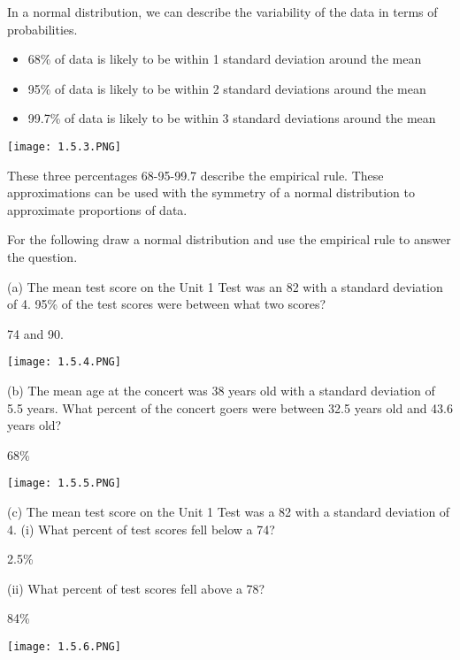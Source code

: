 \documentclass[../stats.tex]{subfiles}
\begin{document}
In a normal distribution, we can describe the variability of the data in terms of probabilities.
\begin{itemize}
    \item 68\% of data is likely to be within 1 standard deviation around the mean 
    \item 95\% of data is likely to be within 2 standard deviations around the mean 
    \item 99.7\% of data is likely to be within 3 standard deviations around the mean 
\end{itemize}
\begin{center}
    \texttt{[image: 1.5.3.PNG]}
\end{center}
These three percentages 68-95-99.7 describe the empirical rule. These approximations can be used with the symmetry of a normal distribution to approximate proportions of data.

\pagebreak
\begin{example}
    For the following draw a normal distribution and use the empirical rule to answer the question.

    (a) The mean test score on the Unit 1 Test was an 82 with a standard deviation of 4. 95\% of the test scores were between what two scores?

    74 and 90.
    \begin{center}
        \texttt{[image: 1.5.4.PNG]}
    \end{center}

    (b) The mean age at the concert was 38 years old with a standard deviation of 5.5 years. What percent of the concert goers were between 32.5 years old and 43.6 years old?

    68\%
    \begin{center}
        \texttt{[image: 1.5.5.PNG]}
    \end{center}

    (c) The mean test score on the Unit 1 Test was a 82 with a standard deviation of 4.
    (i) What percent of test scores fell below a 74?

    2.5\%

    (ii) What percent of test scores fell above a 78?

    84\%
    \begin{center}
        \texttt{[image: 1.5.6.PNG]}
    \end{center}
\end{example}
\end{document}
